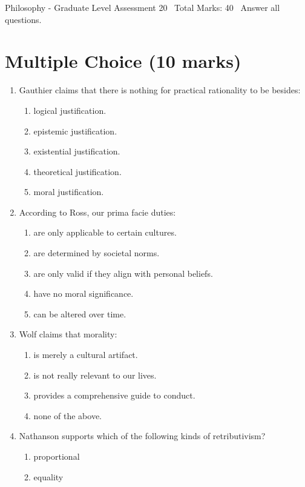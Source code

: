 \documentclass[12pt]{article}
\begin{document}
\begin{center}
Philosophy - Graduate Level Assessment 20 \
Total Marks: 40 \
Answer all questions.
\end{center}

\section*{Multiple Choice (10 marks)}
\begin{enumerate}[label=\arabic*.]
\item Gauthier claims that there is nothing for practical rationality to be besides:
\begin{enumerate}[label=(\alph*)]
    \item logical justification.
    \item epistemic justification.
    \item existential justification.
    \item theoretical justification.
    \item moral justification.
\end{enumerate}
\item According to Ross, our prima facie duties:
\begin{enumerate}[label=(\alph*)]
    \item are only applicable to certain cultures.
    \item are determined by societal norms.
    \item are only valid if they align with personal beliefs.
    \item have no moral significance.
    \item can be altered over time.
\end{enumerate}
\item Wolf claims that morality:
\begin{enumerate}[label=(\alph*)]
    \item is merely a cultural artifact.
    \item is not really relevant to our lives.
    \item provides a comprehensive guide to conduct.
    \item none of the above.
\end{enumerate}
\item Nathanson supports which of the following kinds of retributivism?
\begin{enumerate}[label=(\alph*)]
    \item proportional
    \item equality

\end{enumerate}
\end{enumerate}
\end{document}
